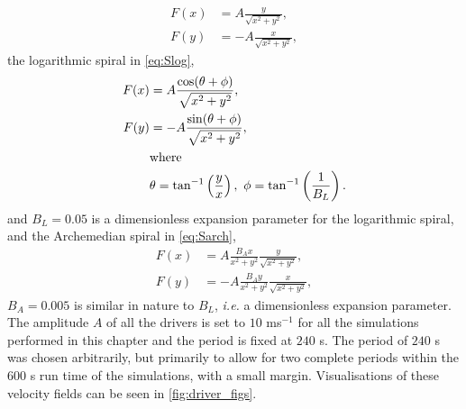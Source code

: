 \begin{subequations}
	\begin{align}
		F(x) &= A \frac{y}{\sqrt{x^2 + y^2}},\\
		F(y) &= - A \frac{x}{\sqrt{x^2 + y^2}},
	\end{align}
	\label{eq:Suni}
\end{subequations}
the logarithmic spiral in \cref{eq:Slog},
\begin{subequations}
	\begin{align}
		F(x) &= A \frac{\cos(\theta + \phi)}{\sqrt{x^2 + y^2}},\\
		F(y) &= - A \frac{\sin(\theta + \phi)}{\sqrt{x^2 + y^2}},\\
			&\text{where}\notag\\
			&\theta = \tan^{-1}\left(\frac{y}{x}\right),\ \phi = \tan^{-1}\left(\frac{1}{B_L}\right).\notag	
	\end{align}
	\label{eq:Slog}
\end{subequations}
and $B_L = 0.05$ is a dimensionless expansion parameter for the logarithmic spiral, and the Archemedian spiral in \cref{eq:Sarch},
\begin{subequations}
	\begin{align}
		F(x) &= A \frac{B_Ax}{x^2 + y^2} \frac{y}{\sqrt{x^2 + y^2}},\\
		F(y) &= - A \frac{B_Ay}{x^2 + y^2} \frac{x}{\sqrt{x^2 + y^2}},
	\end{align}
	\label{eq:Sarch}
\end{subequations}
$B_A = 0.005$ is similar in nature to $B_L$, \textit{i.e.} a dimensionless expansion parameter.
The amplitude $A$ of all the drivers is set to $10$ ms$^{-1}$ for all the simulations performed in this chapter and the period is fixed at $240$ s.
The period of $240$ s was chosen arbitrarily, but primarily to allow for two complete periods within the $600$ s run time of the simulations, with a small margin.
Visualisations of these velocity fields can be seen in \cref{fig:driver_figs}.

